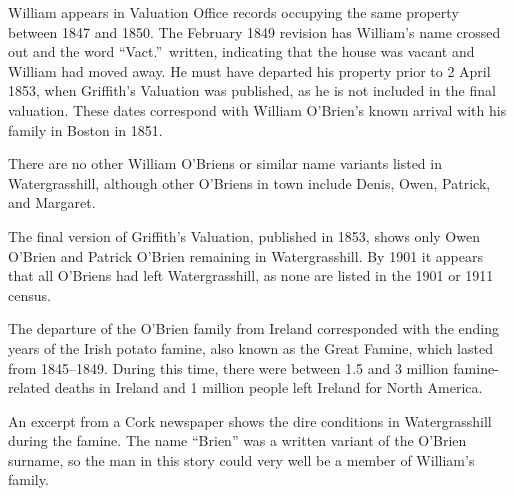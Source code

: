 William appears in Valuation Office records occupying the same property between 1847\cite{TenureBook1847:2} and 1850.\cite{HouseBook1850} The February 1849 revision has William's name crossed out and the word ``Vact.''\ written, indicating that the house was vacant and William had moved away.\cite{House1849} He must have departed his property prior to 2 April 1853, when Griffith's Valuation was published, as he is not included in the final valuation.\cite{WilliamOBrienSearch:2} These dates correspond with William O'Brien's known arrival with his family in Boston in 1851.

There are no other William O'Briens or similar name variants listed in Watergrasshill, although other O'Briens in town include Denis, Owen, Patrick, and Margaret.\cite{Valuation1849:2}

The final version of Griffith's Valuation, published in 1853, shows only Owen O'Bri\-en and Patrick O'Bri\-en remaining in Watergrasshill.\cite{Griffiths:46} By 1901 it appears that all O'Bri\-ens had left Watergrasshill, as none are listed in the 1901 or 1911 census.\cite{1901IrishCensus}

The departure of the O'Brien family from Ireland corresponded with the ending years of the Irish potato famine, also known as the Great Famine, which lasted from 1845--1849. During this time, there were between 1.5 and 3 million famine-related deaths in Ireland and 1 million people left Ireland for North America.\cite{Smith:469}

An excerpt from a Cork newspaper shows the dire conditions in Watergrasshill during the famine. The name ``Brien'' was a written variant of the O'Brien surname,\cite{TimelineReport} so the man in this story could very well be a member of William's family.

